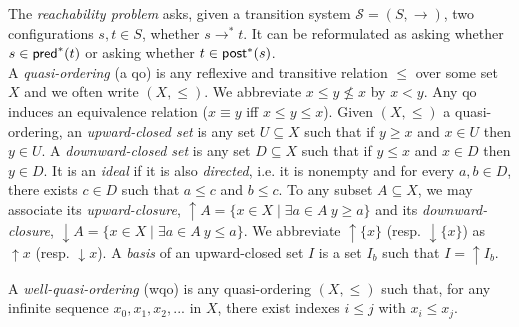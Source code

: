 The {\em reachability problem} asks, given a transition system $\mathscr{S} = (S, \to)$, two configurations $s, t \in S$, whether $s \to^* t$. It can be reformulated as asking whether 
$s \in \textsf{pred}^*(t)$ or asking whether $t \in \textsf{post}^*(s)$. \\

	\iffalse
\problemx{Reachability}
{A transition system $\mathscr{S} = (S, \to)$, two configurations $s, t \in S$}
{$s \to^* t$? \\}
	\fi

%

\noindent
A {\em quasi-ordering} (a qo) is any reflexive and transitive relation $\leq$ over some set $X$ and we often write $(X,\leq)$. We abbreviate $x \leq y \not\leq x$ by $x < y$.
Any qo induces an equivalence relation ($x \equiv y$ iff $x \leq y \leq x$).
Given $(X,\leq)$ a quasi-ordering, an {\em upward-closed set} is any set $U \subseteq X$ such that if $y \geq x$ and $x \in U$ then $y \in U $.
A {\em downward-closed set} is any set $D \subseteq X$ such that if $y \leq x$ and $x \in D$ then $y \in D $. 
It is an {\em ideal } if it is also {\em directed}, i.e. it is nonempty and for every $a,b \in D$, there exists $c \in D$ such that $a \leq c$ and $b \leq c$.
To any subset $A \subseteq X$, we may associate
its {\em upward-closure},
 $\uparrow A = \{x \in X \mid \exists a \in A ~ y \geq a\}$
 and its 
 {\em downward-closure},
 $\downarrow A = \{x \in X \mid \exists a \in A ~ y \leq a\}$. 
We abbreviate $\uparrow \{x\}$ (resp. $\downarrow \{x\}$)
as $\uparrow x$ (resp. $\downarrow x$).
%
A {\em basis} of an upward-closed set $I$ is a set $I_b$ such that $I = \uparrow I_b$. 

\begin{definition}
 A {\em well-quasi-ordering} (wqo) is any quasi-ordering $(X,\leq)$ such that, for any infinite sequence $x_0, x_1, x_2, ...$ in $X$, there exist indexes $i \leq j$ with $x_i \leq  x_j$.
\end{definition}
%
%
\iffalse
%
\begin{lemma}
(Erd\"os and Rado). Assume $\leq$ is a wqo. Then any infinite sequence contains an infinite increasing subsequence: $x_{i_0} \leq x_{i_1} \leq x_{i_2} \cdots$ (with $i_0 < i_1 < i_2 \cdots$).
\end{lemma}


\begin{proof}
Consider an infinite sequence and the set $M = \{i \in N \mid \forall j > i ~ x_i \not\leq x_j \}$. $M$ cannot
be infinite, otherwise it would lead to an infinite subsequence contradicting the wqo
hypothesis. Thus, $M$ is bounded and any $x_i$ with $i$ beyond $M$ can start an infinite
increasing subsequence.
\end{proof}
%
\fi
%


